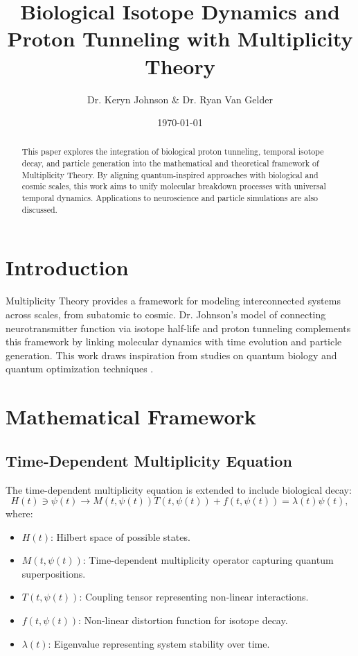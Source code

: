 \documentclass{article}
\theoremstyle{plain}
\begin{document}
\title{Biological Isotope Dynamics and Proton Tunneling with Multiplicity Theory}
\author{Dr. Keryn Johnson \& Dr. Ryan Van Gelder}
\date{\today}

\maketitle

\begin{abstract}
This paper explores the integration of biological proton tunneling, temporal isotope decay, and particle generation into the mathematical and theoretical framework of Multiplicity Theory. By aligning quantum-inspired approaches with biological and cosmic scales, this work aims to unify molecular breakdown processes with universal temporal dynamics. Applications to neuroscience and particle simulations are also discussed.
\end{abstract}

\section{Introduction}
Multiplicity Theory provides a framework for modeling interconnected systems across scales, from subatomic to cosmic. Dr. Johnson's model of connecting neurotransmitter function via isotope half-life and proton tunneling complements this framework by linking molecular dynamics with time evolution and particle generation. This work draws inspiration from studies on quantum biology \cite{QuantumBiology2017} and quantum optimization techniques \cite{QuantumOptimization2023}.

\section{Mathematical Framework}

\subsection{Time-Dependent Multiplicity Equation}
The time-dependent multiplicity equation is extended to include biological decay:
\begin{equation}
H(t) \ni \psi(t) \rightarrow M(t, \psi(t)) T(t, \psi(t)) + f(t, \psi(t)) = \lambda(t) \psi(t),
\end{equation}
where:
\begin{itemize}
    \item \( H(t) \): Hilbert space of possible states.
    \item \( M(t, \psi(t)) \): Time-dependent multiplicity operator capturing quantum superpositions.
    \item \( T(t, \psi(t)) \): Coupling tensor representing non-linear interactions.
    \item \( f(t, \psi(t)) \): Non-linear distortion function for isotope decay.
    \item \( \lambda(t) \): Eigenvalue representing system stability over time.
\end{itemize}
\end{document}
